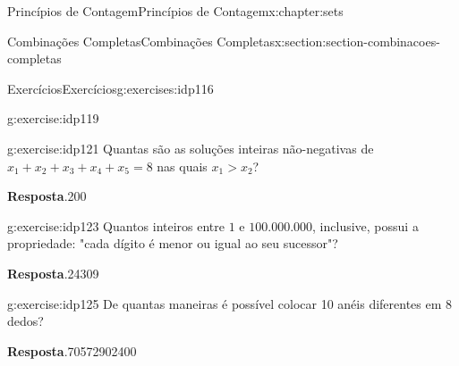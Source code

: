 \documentclass[oneside,10pt,]{book}
\newcommand{\blocktitlefont}{\relax}
\numberwithin{equation}{section}
\begin{document}
\begin{chapterptx}{Princípios de Contagem}{}{Princípios de Contagem}{}{}{x:chapter:sets}
\begin{sectionptx}{Combinações Completas}{}{Combinações Completas}{}{}{x:section:section-combinacoes-completas}
\begin{exercises-subsection}{Exercícios}{}{Exercícios}{}{}{g:exercises:idp116}
\begin{divisionexercise}{2}{}{}{g:exercise:idp119}
\end{divisionexercise}%
\begin{divisionexercise}{3}{}{}{g:exercise:idp121}%
Quantas são as soluções inteiras não-negativas de \(x_1+x_2+x_3+x_4+x_5 = 8\) nas quais \(x_1>x_2\)?%
\par\smallskip%
\noindent\textbf{\blocktitlefont Resposta}.\hypertarget{g:answer:idp122}{}\quad{}200%
\end{divisionexercise}%
\begin{divisionexercise}{4}{}{}{g:exercise:idp123}%
Quantos inteiros entre \(1\) e \(100.000.000\), inclusive, possui a propriedade: "cada dígito é menor ou igual ao seu sucessor"?%
\par\smallskip%
\noindent\textbf{\blocktitlefont Resposta}.\hypertarget{g:answer:idp124}{}\quad{}24309%
\end{divisionexercise}%
\begin{divisionexercise}{5}{}{}{g:exercise:idp125}%
De quantas maneiras é possível colocar 10 anéis diferentes em 8 dedos?%
\par\smallskip%
\noindent\textbf{\blocktitlefont Resposta}.\hypertarget{g:answer:idp126}{}\quad{}70572902400%
\end{divisionexercise}%
\end{exercises-subsection}
\end{sectionptx}
\end{chapterptx}
%
%
\typeout{************************************************}
\typeout{************************************************}
%
\end{document}
